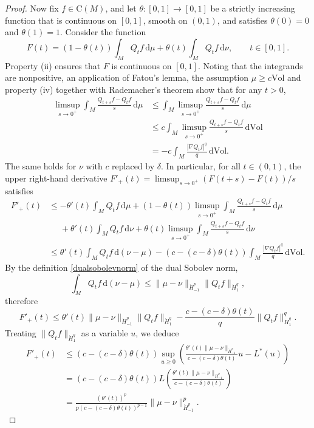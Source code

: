 \documentclass[11pt,a4paper]{article}
\theoremstyle{definition}
\begin{document}
\begin{proof}
Now fix $f \in \mathrm{C}(M)$, and let $\theta: [0,1] \to [0,1]$ be a strictly increasing function that is continuous on $[0,1]$, smooth on $(0,1)$, and satisfies $\theta (0)=0$ and $\theta(1)=1$. Consider the function
\[ F(t) = (1-\theta(t)) \int_M Q_t f \, \mathrm{d} \mu + \theta (t) \int_M Q_t f \, \mathrm{d} \nu, \qquad t \in [0,1] . \]
Property (ii) ensures that $F$ is continuous on $[0,1]$. Noting that the integrands are nonpositive, an application of Fatou's lemma, the assumption $\mu \ge c \mathrm{Vol}$ and property (iv) together with Rademacher's theorem show that for any $t>0$,
\[ \begin{split} \limsup_{s \to 0^+} \int_M \frac{Q_{t+s}f - Q_t f}{s} \, \mathrm{d}\mu &\le \int_M \limsup_{s \to 0^+} \frac{Q_{t+s}f - Q_t f}{s} \, \mathrm{d}\mu \\ &\le c \int_M \limsup_{s \to 0^+} \frac{Q_{t+s}f - Q_t f}{s} \, \mathrm{d}\mathrm{Vol} \\ &= - c \int_M \frac{|\nabla Q_t f|^q}{q} \, \mathrm{d} \mathrm{Vol}. \end{split} \]
The same holds for $\nu$ with $c$ replaced by $\delta$. In particular, for all $t \in (0,1)$, the upper right-hand derivative $F'_+(t)=\limsup_{s \to 0^+} (F(t+s)-F(t))/s$ satisfies
\[ \begin{split} F'_+ (t) &\le -\theta'(t) \int_M Q_t f \, \mathrm{d} \mu + (1-\theta(t)) \limsup_{s \to 0^+} \int_M \frac{Q_{t+s}f - Q_t f}{s} \, \mathrm{d}\mu \\ &{\phantom{\le}} + \theta'(t) \int_M Q_t f \, \mathrm{d} \nu + \theta(t) \limsup_{s \to 0^+} \int_M \frac{Q_{t+s}f - Q_t f}{s} \, \mathrm{d}\nu \\ &\le \theta'(t) \int_M Q_t f \, \mathrm{d} (\nu - \mu) - (c-(c-\delta) \theta(t)) \int_M \frac{|\nabla Q_t f|^q}{q} \, \mathrm{d}\mathrm{Vol}. \end{split} \]
By the definition \eqref{dualsobolevnorm} of the dual Sobolev norm,
\[ \int_M Q_t f \, \mathrm{d} (\nu - \mu) \le \| \mu - \nu \|_{\dot{H}_{-1}^p} \| Q_t f \|_{\dot{H}_1^q} , \]
therefore
\[ F'_+(t) \le \theta'(t) \| \mu - \nu \|_{\dot{H}_{-1}^p} \| Q_t f \|_{\dot{H}_1^q} - \frac{c-(c-\delta) \theta(t)}{q} \| Q_t f \|_{\dot{H}_1^q}^q . \]
Treating $\| Q_t f \|_{\dot{H}_1^q}$ as a variable $u$, we deduce
\[ \begin{split} F'_+(t) &\le (c-(c-\delta)\theta(t)) \sup_{u \ge 0} \left( \frac{\theta'(t) \| \mu - \nu \|_{\dot{H}_{-1}^p}}{c-(c-\delta)\theta(t)} u - L^* (u) \right) \\ &= (c-(c-\delta)\theta(t)) L \left( \frac{\theta'(t) \| \mu - \nu \|_{\dot{H}_{-1}^p}}{c-(c-\delta)\theta(t)} \right) \\ &= \frac{(\theta' (t))^p}{p (c-(c-\delta)\theta (t))^{p-1}} \| \mu - \nu \|_{\dot{H}_{-1}^p}^p . \end{split} \]

\end{proof}
\end{document}
